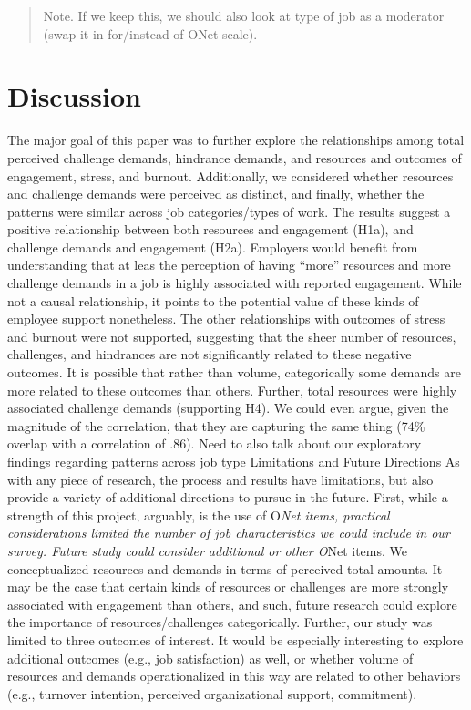\documentclass[
  man]{apa6}
\begin{document}
\begin{quote}
Note. If we keep this, we should also look at type of job as a moderator (swap it in for/instead of ONet scale).
\end{quote}

\hypertarget{discussion}{%
\section{Discussion}\label{discussion}}

The major goal of this paper was to further explore the relationships among total perceived challenge demands, hindrance demands, and resources and outcomes of engagement, stress, and burnout. Additionally, we considered whether resources and challenge demands were perceived as distinct, and finally, whether the patterns were similar across job categories/types of work. The results suggest a positive relationship between both resources and engagement (H1a), and challenge demands and engagement (H2a). Employers would benefit from understanding that at leas the perception of having ``more'' resources and more challenge demands in a job is highly associated with reported engagement. While not a causal relationship, it points to the potential value of these kinds of employee support nonetheless. The other relationships with outcomes of stress and burnout were not supported, suggesting that the sheer number of resources, challenges, and hindrances are not significantly related to these negative outcomes. It is possible that rather than volume, categorically some demands are more related to these outcomes than others.
Further, total resources were highly associated challenge demands (supporting H4). We could even argue, given the magnitude of the correlation, that they are capturing the same thing (74\% overlap with a correlation of .86). Need to also talk about our exploratory findings regarding patterns across job type
Limitations and Future Directions
As with any piece of research, the process and results have limitations, but also provide a variety of additional directions to pursue in the future. First, while a strength of this project, arguably, is the use of O\emph{Net items, practical considerations limited the number of job characteristics we could include in our survey. Future study could consider additional or other O}Net items. We conceptualized resources and demands in terms of perceived total amounts. It may be the case that certain kinds of resources or challenges are more strongly associated with engagement than others, and such, future research could explore the importance of resources/challenges categorically. Further, our study was limited to three outcomes of interest. It would be especially interesting to explore additional outcomes (e.g., job satisfaction) as well, or whether volume of resources and demands operationalized in this way are related to other behaviors (e.g., turnover intention, perceived organizational support, commitment).
\end{document}
